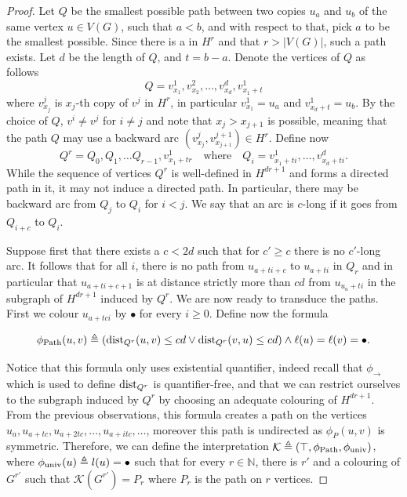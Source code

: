 \begin{proof}
Let $Q$ be the smallest possible path between two copies $u_a$ and $u_b$ of the same vertex $u\in V(G)$, such that $a<b$, and with respect to that, pick $a$ to be the smallest possible. Since there is a  in $H^r$ and that  $r > |V(G)|$, such a path exists. 
Let $d$ be the length of $Q$, and $t = b-a$. Denote the vertices of $Q$ as follows $$Q = v^1_{x_1}, v^2_{x_2}, \dots ,v^d_{x_d},v^1_{x_1+t}$$ 
where $v^j_{x_j}$ is $x_j$-th copy of $v^j$ in $H^r$, in particular $v^1_{x_1}=u_a$ and $v^1_{x_d+t}=u_b$. By the choice of $Q$, $v^i\neq v^j$ for $i\neq j$ and note that $x_j > x_{j+1}$ is possible, meaning that the path $Q$ may use a backward arc $(v^j_{x_j}, v^{j+1}_{x_{j+1}}) \in H^r$. %
Define now 
$$Q^r = Q_0,Q_1, \dots Q_{r-1}, v^1_{x_1+tr} \quad \text{where} \quad  Q_i = v^1_{x_1+ti}, \dots ,v^d_{x_d+ti}.$$
While the sequence of vertices $Q^r$ is well-defined in $H^{dr+1}$ and forms a directed path in it, it may not induce a directed path. 
In particular, there may be backward arc from $Q_j$ to $Q_i$ for $i<j$. We say that an arc is $c$-long if it goes from $Q_{i+c}$ to $Q_i$. 


Suppose first that there exists a $c<2d$ such that for $c'\geq c$ there is no $c'$-long arc. 
It follows that for all $i$, there is no path from $u_{a+ti+c}$ to $u_{a+ti}$ in $Q_r$ and in particular that $u_{a+ti+c+1}$ is at distance strictly more than $cd$ from $u_{u_a+ti}$ in the subgraph of $H^{dr+1}$ induced by $Q^r$. 
We are now ready to transduce the paths. First we colour $u_{a+tci}$ by $\bullet$ for every $i\geq 0$. Define now the formula

\begin{equation}
  \phi_{\operatorname{Path}}(u,v)  \triangleq (\operatorname{dist}_{Q^r}(u,v)\leq cd \lor 
  \operatorname{dist}_{Q^r}(v,u)\leq cd) \land 
  \ell(u) = \ell(v) = \bullet.
\end{equation}

Notice that this formula only uses existential quantifier, indeed recall that $\phi_{\rightarrow}$ which is used to define $\operatorname{dist}_{Q^r}$ is quantifier-free, and that we can restrict ourselves to the subgraph induced by $Q^r$ by choosing an adequate colouring of $H^{dr+1}$. 
From the previous observations, this formula creates a path on the vertices $u_{a}, u_{a+tc}, u_{a+2tc},\dots, u_{a+itc}, \dots$, moreover this path
is undirected as $\phi_P(u,v)$ is symmetric. Therefore, we can define the interpretation $\mathcal{K}
\triangleq (\top, \phi_{\operatorname{Path}}, \phi_{\text{univ}})$, where
$\phi_{\text{univ}}(u) \triangleq l(u) = \bullet$ such that for every $r\in \mathbb{N}$, there is $r'$ and a colouring of $G^{r'}$ such that $\mathcal{K}(G^{r'}) = P_r$ where $P_r$ is the path on $r$ vertices. 




\end{proof}
